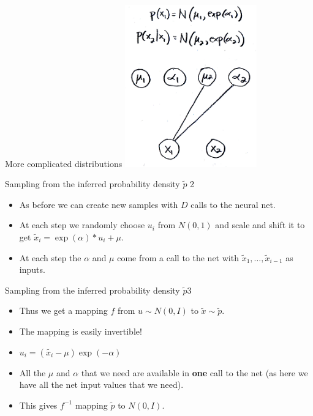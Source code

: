 \documentclass[usenames,dvipsnames]{beamer}
\begin{document}
\begin{frame}{More complicated distributions}
     \centering
     \includegraphics[height=7cm]{image_05}
\end{frame}


\begin{frame}{Sampling from the inferred probability density $\tilde{p}$ 2}
    \begin{itemize}
      \item{As before we can create new samples with $D$ calls to the neural net.}
	\item{At each step we randomly choose $u_i$ from $N(0, 1)$ and scale and shift it to get $\tilde{x}_i = \exp(\alpha) * u_i + \mu$.}
	\item{At each step the $\alpha$ and $\mu$ come from a call to the net with $\tilde{x}_1, \dots, \tilde{x}_{i-1}$ as inputs.}
    \end{itemize}
\end{frame}

\begin{frame}{Sampling from the inferred probability density $\tilde{p} $3}
    \begin{itemize}
      \item{Thus we get a mapping $f$ from $u \sim N(0, I)$ to $\tilde{x} \sim \tilde{p}$.}
	\item{The mapping is easily invertible!}
	\item{$u_i = (\tilde{x_i} - \mu) \exp(-\alpha)$}
	\item{All the $\mu$ and $\alpha$ that we need are available in \textbf{one} call to the net (as here we have all the net input values that we need).}
	\item{This gives $f^{-1}$ mapping $\tilde{p}$ to $N(0, I)$.}
    \end{itemize}
\end{frame}
\end{document}

